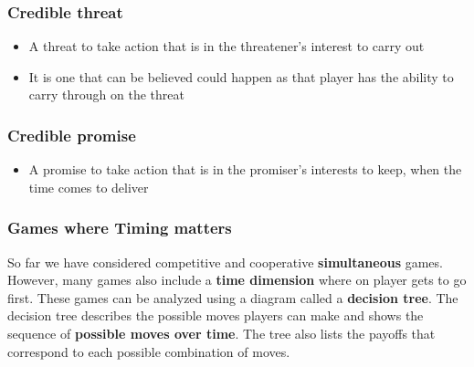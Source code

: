 \subsubsection{Credible threat}
\begin{itemize}
	\item A threat to take action that is in the threatener's interest to carry out
	\item It is one that can be believed could happen as that player has the ability to carry through on the threat
\end{itemize}
\subsubsection{Credible promise}
\begin{itemize}
	\item A promise to take action that is in the promiser's interests to keep, when the time comes to deliver
\end{itemize}
\subsubsection{Games where Timing matters}
So far we have considered competitive and cooperative \textbf{simultaneous} games. However, many games also include a \textbf{time dimension} where on player gets to go first. These games can be analyzed using a diagram called a \textbf{decision tree}. The decision tree describes the possible moves players can make and shows the sequence of \textbf{possible moves over time}. The tree also lists the payoffs that correspond to each possible combination of moves.